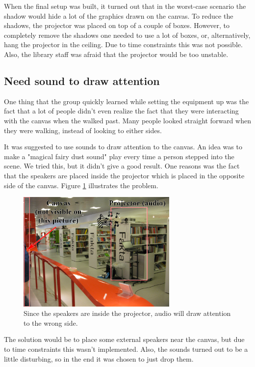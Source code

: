 When the final setup was built, it turned out that in the worst-case scenario the shadow would hide a lot of the graphics drawn on the canvas. To reduce the shadows, the projector was placed on top of a couple of boxes. However, to completely remove the shadows one needed to use a lot of boxes, or, alternatively, hang the projector in the ceiling. Due to time constraints this was not possible. Also, the library staff was afraid that the projector would be too unstable.

\subsection{Need sound to draw attention}
One thing that the group quickly learned while setting the equipment up was the fact that a lot of people didn't even realize the fact that they were interacting with the canvas when the walked past. Many people looked straight forward when they were walking, instead of looking to either sides.

It was suggested to use sounds to draw attention to the canvas. An idea was to make a "magical fairy dust sound" play every time a person stepped into the scene. We tried this, but it didn't give a good result. One reasons was the fact that the speakers are placed inside the projector which is placed in the opposite side of the canvas. Figure \ref{fig:projector_audio} illustrates the problem.

\begin{figure}[htbp]
\centering
\includegraphics[width=0.70\textwidth]{Pictures/Design/projector_audio}
\caption{Since the speakers are inside the projector, audio will draw attention to the wrong side.}
\label{fig:projector_audio}
\end{figure}

The solution would be to place some external speakers near the canvas, but due to time constraints this wasn't implemented. Also, the sounds turned out to be a little disturbing, so in the end it was chosen to just drop them.

